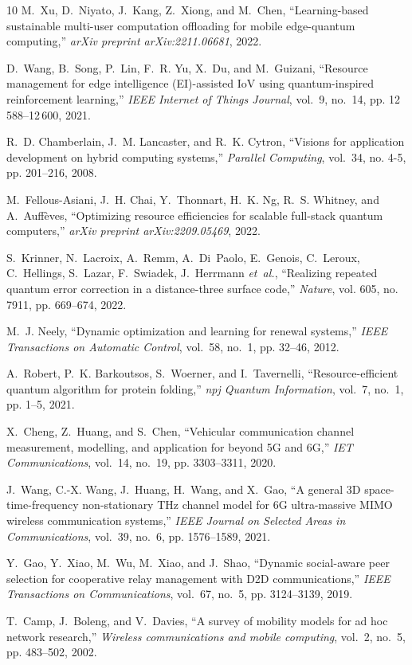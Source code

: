 \documentclass[journal]{IEEEtran}
\begin{document}
\begin{thebibliography}{10}
M.~Xu, D.~Niyato, J.~Kang, Z.~Xiong, and M.~Chen, ``Learning-based sustainable
  multi-user computation offloading for mobile edge-quantum computing,''
  \emph{arXiv preprint arXiv:2211.06681}, 2022.

D.~Wang, B.~Song, P.~Lin, F.~R. Yu, X.~Du, and M.~Guizani, ``Resource
  management for edge intelligence ({EI})-assisted {IoV} using quantum-inspired
  reinforcement learning,'' \emph{IEEE Internet of Things Journal}, vol.~9,
  no.~14, pp. 12\,588--12\,600, 2021.

R.~D. Chamberlain, J.~M. Lancaster, and R.~K. Cytron, ``Visions for application
  development on hybrid computing systems,'' \emph{Parallel Computing},
  vol.~34, no. 4-5, pp. 201--216, 2008.

M.~Fellous-Asiani, J.~H. Chai, Y.~Thonnart, H.~K. Ng, R.~S. Whitney, and
  A.~Auff{\`e}ves, ``Optimizing resource efficiencies for scalable full-stack
  quantum computers,'' \emph{arXiv preprint arXiv:2209.05469}, 2022.

S.~Krinner, N.~Lacroix, A.~Remm, A.~Di~Paolo, E.~Genois, C.~Leroux,
  C.~Hellings, S.~Lazar, F.~Swiadek, J.~Herrmann \emph{et~al.}, ``Realizing
  repeated quantum error correction in a distance-three surface code,''
  \emph{Nature}, vol. 605, no. 7911, pp. 669--674, 2022.

M.~J. Neely, ``Dynamic optimization and learning for renewal systems,''
  \emph{IEEE Transactions on Automatic Control}, vol.~58, no.~1, pp. 32--46,
  2012.

A.~Robert, P.~K. Barkoutsos, S.~Woerner, and I.~Tavernelli,
  ``Resource-efficient quantum algorithm for protein folding,'' \emph{npj
  Quantum Information}, vol.~7, no.~1, pp. 1--5, 2021.

X.~Cheng, Z.~Huang, and S.~Chen, ``Vehicular communication channel measurement,
  modelling, and application for beyond {5G} and {6G},'' \emph{IET
  Communications}, vol.~14, no.~19, pp. 3303--3311, 2020.

J.~Wang, C.-X. Wang, J.~Huang, H.~Wang, and X.~Gao, ``A general {3D}
  space-time-frequency non-stationary {THz} channel model for {6G}
  ultra-massive {MIMO} wireless communication systems,'' \emph{IEEE Journal on
  Selected Areas in Communications}, vol.~39, no.~6, pp. 1576--1589, 2021.

Y.~Gao, Y.~Xiao, M.~Wu, M.~Xiao, and J.~Shao, ``Dynamic social-aware peer
  selection for cooperative relay management with {D2D} communications,''
  \emph{IEEE Transactions on Communications}, vol.~67, no.~5, pp. 3124--3139,
  2019.

T.~Camp, J.~Boleng, and V.~Davies, ``A survey of mobility models for ad hoc
  network research,'' \emph{Wireless communications and mobile computing},
  vol.~2, no.~5, pp. 483--502, 2002.

\end{thebibliography}
\end{document}
